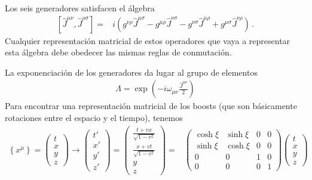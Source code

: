 \begin{frame}
Los seis generadores satisfacen el álgebra
\begin{align}
\label{eq:lrtalg}
  \left[\widehat{J}^{\mu\nu},\widehat{J}^{\rho\sigma}\right]=&
i(g^{\nu\rho}\widehat{J}^{\mu\sigma}-g^{\mu\rho}\widehat{J}^{\nu\sigma}-g^{\nu\sigma}\widehat{J}^{\mu\rho}+g^{\mu\sigma}\widehat{J}^{\nu\rho})\,.
\end{align}
Cualquier representación matricial de estos operadores que vaya a representar esta álgebra debe obedecer las mismas reglas de conmutación.


  La exponenciación de los generadores da lugar al grupo de elementos 
\begin{align}
  \widehat{\Lambda}=\exp\left(-i\omega_{\mu\nu}\frac{\widehat{J}^{\mu\nu}}{2}\right)
\end{align}
Para encontrar una representación matricial de los boosts (que son básicamente rotaciones entre el espacio y el tiempo), tenemos
\begin{align}
  \left\{x^\mu\right\}=\begin{pmatrix}
    t\\
    x\\
    y\\
    z
  \end{pmatrix}\to
  \begin{pmatrix}
    t'\\
    x'\\
    y'\\
    z'
  \end{pmatrix}=
  \begin{pmatrix}
    \frac{t+vx}{\sqrt{1-v^2}}\\
    \frac{x+vt}{\sqrt{1-v^2}}\\
    y\\
    z
  \end{pmatrix}=&
  \begin{pmatrix}
    \cosh\xi&\sinh\xi&0&0\\
    \sinh\xi&\cosh\xi&0&0\\
    0     &  0  &1&0\\
    0     &  0  &0&1
  \end{pmatrix}
  \begin{pmatrix}
    t\\
    x\\
    y\\
    z
  \end{pmatrix}\nonumber\\

\end{align}
\end{frame}
